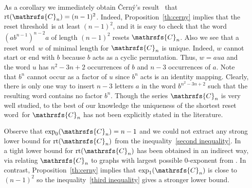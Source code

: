 \documentclass[11pt]{llncs}
\newcommand{\sw}{reset word}
\newcommand{\reth}{reset threshold}
\DeclareMathOperator{\rt}{rt}
\begin{document}
As a corollary we immediately obtain \v{C}ern\'{y}'s
result~\cite[Lemma~1]{Ce64} that $\rt(\mathrsfs{C}_n)=(n - 1)^2$. Indeed,
Proposition~\ref{th:cerny} implies that the \reth\ is at least $(n - 1)^2$, and
it is easy to check that the word $(ab^{n - 1})^{n - 2}a$ of length $(n - 1)^2$
resets $\mathrsfs{C}_n$. Also we see that a \sw\ $w$ of minimal length for
$\mathrsfs{C}_n$ is unique. Indeed, $w$ cannot start or end with $b$ because
$b$ acts as a cyclic permutation. Thus, $w = aua$ and the word $u$ has $n^2 -
3n + 2$ occurrences of $b$ and $n - 3$ occurrences of $a$. Note that $b^n$
cannot occur as a factor of $u$ since $b^n$ acts is an identity mapping.
Clearly, there is only one way to insert $n - 3$ letters $a$ in the word
$b^{n^2-3n+2}$ such that the resulting word contains no factor $b^n$. Though
the series $\mathrsfs{C}_n$ is very well studied, to the best of our knowledge
the uniqueness of the shortest \sw\ for $\mathrsfs{C}_n$ has not been
explicitly stated in the literature.

Observe that $\exp_0(\mathrsfs{C}_n)=n-1$ and we could not extract any strong
lower bound for $\rt(\mathrsfs{C}_n)$ from the inequality~\eqref{second
inequality}. In~\cite{AGV} a tight lower bound for $\rt(\mathrsfs{C}_n)$ has
been obtained in an indirect way, via relating $\mathrsfs{C}_n$ to graphs with
largest possible 0-exponent from \cite{Wi50}. In contrast,
Proposition~\ref{th:cerny} implies that $\exp_1(\mathrsfs{C}_n)$ is close to
$(n-1)^2$ so the inequality~\eqref{third inequality} gives a stronger lower
bound.
\end{document}
